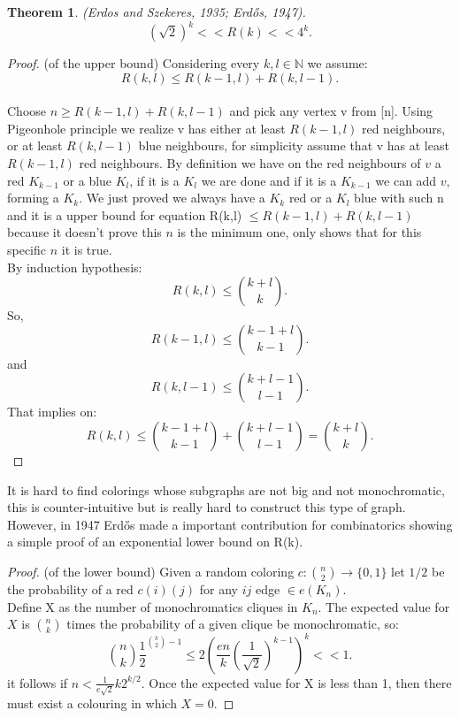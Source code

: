\documentclass[12pt,twoside,a4paper]{book}
\numberwithin{equation}{section}
\newtheorem{theorem}             {Theorem}[section]
\theoremstyle{remark}
\begin{document}
\begin{theorem}\label{thm:ErdosandS}
(Erdos and Szekeres, 1935; Erd\H{o}s, 1947).\\
$$(\sqrt{2})^k << R(k) << 4^k.$$
\end{theorem}
\begin{proof} (of the upper bound) Considering every $k, l \in \mathbb{N}$ we assume:\\
$$R(k,l) \leq R(k-1,l)+R(k,l-1).$$\\
Choose $n \geq R(k-1,l) + R(k, l-1)$ and pick any vertex v from [n]. Using Pigeonhole principle we realize v has  either at least $R(k-1,l)$ red neighbours, or at least $R(k,l-1)$ blue neighbours, for simplicity assume that v has at least $R(k-1,l)$ red neighbours. By definition we have on the red neighbours of $v$ a red $K_{k-1}$ or a blue $K_l$, if it is a $K_l$ we are done and if it is a $K_{k-1}$ we can add $v$, forming a $K_k$. We just proved we always have a $K_k$ red or a $K_l$ blue with such n and it is a upper bound for equation R(k,l) $\leq R(k-1,l)+R(k,l-1)$ because it doesn't prove this $n$ is the minimum one, only shows that for this specific $n$ it is true.\\
By induction hypothesis:
$$R(k,l) \leq \binom{k+l}{k}.$$
So,
$$R(k-1,l)\leq \binom{k-1+l}{k-1}.$$ and $$R(k,l-1)\leq \binom{k+l-1}{l-1}.$$
That implies on:
$$R(k,l)\leq \binom{k-1+l}{k-1} + \binom{k+l-1}{l-1} = \binom{k+ l}{k}.$$
\end{proof}
It is hard to find colorings whose subgraphs are not big and not monochromatic, this is counter-intuitive but is really hard to construct this type of graph. However, in 1947 Erd\H{o}s made a important contribution for combinatorics showing a simple proof of an exponential lower bound on R(k).\\
\begin{proof} (of the lower bound) Given a random coloring $c\colon \binom{n}{2} \rightarrow \{0,1\}$ let $1/2$ be the probability of a red $c(i)(j)$ for any $ij$ edge $\in e(K_n)$.\\ 
Define X as the number of monochromatics cliques in $K_n$. The expected value for $X$ is $\binom{n}{k}$ times the probability of a given clique be monochromatic, so:
$$\binom{n}{k}\frac{1}{2} ^{\binom{k}{2}-1} \leq 2 ( \frac{en}{k} ( \frac{1}{\sqrt{2}} )^{k-1} )^{k} << 1.$$ 
it follows if $n<\frac{1}{e\sqrt{2}}k2^{k/2}$. Once the expected value for X is less than 1, then there must exist a colouring in which $X=0.$
\end{proof}
\end{document}
